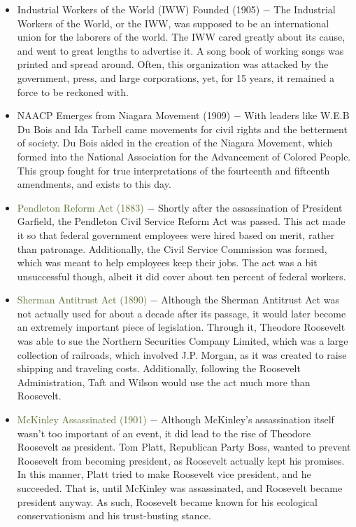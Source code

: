 \documentclass[12pt]{article}
\begin{document}
\begin{itemize}
  \item \textcolor{darkmidnightblue}{Industrial Workers of the World (IWW) Founded (1905)} $-$ The Industrial Workers of the World, or the IWW, was supposed to be an international union for the laborers of the world. The IWW cared greatly about its cause, and went to great lengths to advertise it. A song book of working songs was printed and spread around. Often, this organization was attacked by the government, press, and large corporations, yet, for 15 years, it remained a force to be reckoned with.

  \item \textcolor{darkmidnightblue}{NAACP Emerges from Niagara Movement (1909)} $-$ With leaders like W.E.B Du Bois and Ida Tarbell came movements for civil rights and the betterment of society. Du Bois aided in the creation of the Niagara Movement, which formed into the National Association for the Advancement of Colored People. This group fought for true interpretations of the fourteenth and fifteenth amendments, and exists to this day.

  \item \textcolor{darkolivegreen}{Pendleton Reform Act (1883)} $-$ Shortly after the assassination of President Garfield, the Pendleton Civil Service Reform Act was passed. This act made it so that federal government employees were hired based on merit, rather than patronage. Additionally, the Civil Service Commission was formed, which was meant to help employees keep their jobs. The act was a bit unsuccessful though, albeit it did cover about ten percent of federal workers.

  \item \textcolor{darkolivegreen}{Sherman Antitrust Act (1890)} $-$ Although the Sherman Antitrust Act was not actually used for about a decade after its passage, it would later become an extremely important piece of legislation. Through it, Theodore Roosevelt was able to sue the Northern Securities Company Limited, which was a large collection of railroads, which involved J.P. Morgan, as it was created to raise shipping and traveling costs. Additionally, following the Roosevelt Administration, Taft and Wilson would use the act much more than Roosevelt.

  \item \textcolor{darkolivegreen}{McKinley Assassinated (1901)} $-$ Although McKinley's assassination itself wasn't too important of an event, it did lead to the rise of Theodore Roosevelt as president. Tom Platt, Republican Party Boss, wanted to prevent Roosevelt from becoming president, as Roosevelt actually kept his promises. In this manner, Platt tried to make Roosevelt vice president, and he succeeded. That is, until McKinley was assassinated, and Roosevelt became president anyway. As such, Roosevelt became known for his ecological conservationism and his trust-busting stance.


\end{itemize}
\end{document}
